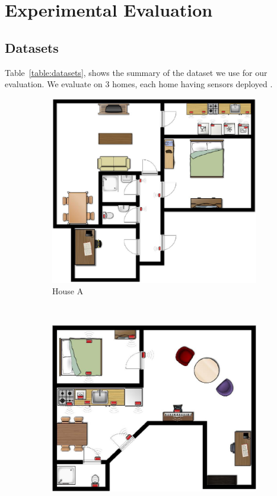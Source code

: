 \section{Experimental Evaluation}

\subsection{Datasets}


Table~\ref{table:datasets}, shows the summary of the dataset we use for our evaluation. We evaluate on 3 homes, each home having sensors deployed .

\begin{figure}
	\centering
	\begin{subfigure}[b]{0.35\textwidth}
		\includegraphics[width=\textwidth]{fig/houseA.png}
		\caption{House A}
		\label{fig:houseA}
	\end{subfigure}
	~
	\begin{subfigure}[b]{0.35\textwidth}
		\includegraphics[width=\textwidth]{fig/houseB.png}

\end{subfigure}
\end{figure}
